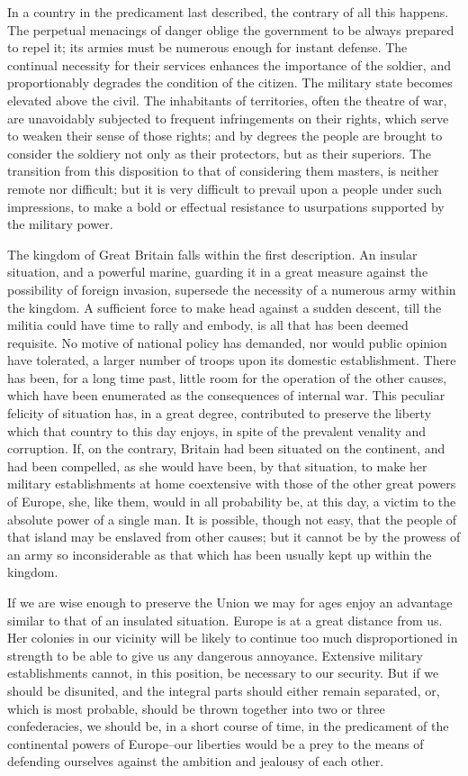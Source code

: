 In a country in the predicament last described, the contrary of all this happens. The perpetual menacings of danger oblige the government to be always prepared to repel it; its armies must be numerous enough for instant defense. The continual necessity for their services enhances the importance of the soldier, and proportionably degrades the condition of the citizen. The military state becomes elevated above the civil. The inhabitants of territories, often the theatre of war, are unavoidably subjected to frequent infringements on their rights, which serve to weaken their sense of those rights; and by degrees the people are brought to consider the soldiery not only as their protectors, but as their superiors. The transition from this disposition to that of considering them masters, is neither remote nor difficult; but it is very difficult to prevail upon a people under such impressions, to make a bold or effectual resistance to usurpations supported by the military power.

The kingdom of Great Britain falls within the first description. An insular situation, and a powerful marine, guarding it in a great measure against the possibility of foreign invasion, supersede the necessity of a numerous army within the kingdom. A sufficient force to make head against a sudden descent, till the militia could have time to rally and embody, is all that has been deemed requisite. No motive of national policy has demanded, nor would public opinion have tolerated, a larger number of troops upon its domestic establishment. There has been, for a long time past, little room for the operation of the other causes, which have been enumerated as the consequences of internal war. This peculiar felicity of situation has, in a great degree, contributed to preserve the liberty which that country to this day enjoys, in spite of the prevalent venality and corruption. If, on the contrary, Britain had been situated on the continent, and had been compelled, as she would have been, by that situation, to make her military establishments at home coextensive with those of the other great powers of Europe, she, like them, would in all probability be, at this day, a victim to the absolute power of a single man. It is possible, though not easy, that the people of that island may be enslaved from other causes; but it cannot be by the prowess of an army so inconsiderable as that which has been usually kept up within the kingdom.

If we are wise enough to preserve the Union we may for ages enjoy an advantage similar to that of an insulated situation. Europe is at a great distance from us. Her colonies in our vicinity will be likely to continue too much disproportioned in strength to be able to give us any dangerous annoyance. Extensive military establishments cannot, in this position, be necessary to our security. But if we should be disunited, and the integral parts should either remain separated, or, which is most probable, should be thrown together into two or three confederacies, we should be, in a short course of time, in the predicament of the continental powers of Europe--our liberties would be a prey to the means of defending ourselves against the ambition and jealousy of each other.

